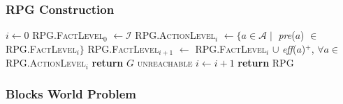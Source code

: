 \documentclass{beamer}
\begin{document}
	\begin{frame}[c]\frametitle{RPG Construction}
		\begin{algorithmic}[1]
			\small
		    		\State $i \gets 0$
		    		\State \textsc{RPG.FactLevel$_{0}$} $\gets \mathcal{I}$
		    			\State \textsc{RPG.ActionLevel$_{i}$} $\gets \lbrace a \in \mathcal{A} \mid$ \textit{pre}($a$) $\in$ \textsc{RPG.FactLevel$_{i}$}$\rbrace$
		    			\State \textsc{RPG.FactLevel$_{i+1}$} $\gets$ \textsc{RPG.FactLevel$_{i}$} $\cup$ \textit{eff}($a$)$^+$, $\forall a \in$ \textsc{RPG.ActionLevel$_{i}$}
						\State \textbf{return} $G$ \textsc{unreachable} 
					\EndIf
		    			\State $i \gets i + 1$
		    		\EndWhile
		        \State \textbf{return} \textsc{RPG}
		    \EndFunction
		\end{algorithmic}
	\end{frame}
	
	\begin{frame}[c]\frametitle{Blocks World Problem}
		
	\end{frame}

	
\end{document}

